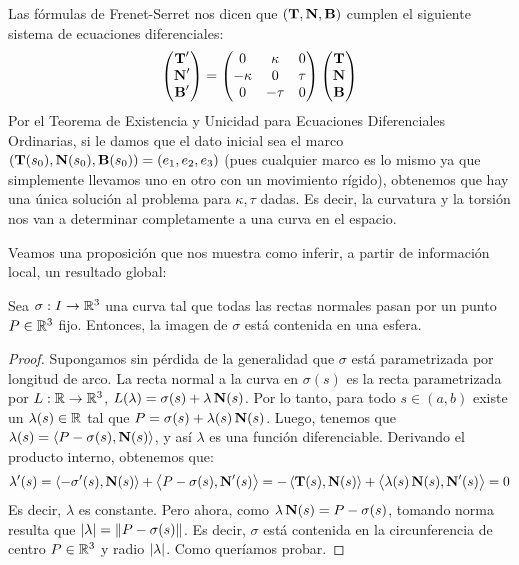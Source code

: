 Las fórmulas de Frenet-Serret nos dicen que $(\operatorname{\mathbf{T}},\operatorname{\mathbf{N}},\operatorname{\mathbf{B}})$ cumplen el siguiente sistema de ecuaciones diferenciales: $$\begin{pmatrix}\operatorname{\mathbf{T}}' \\ \operatorname{\mathbf{N}}'\\ \operatorname{\mathbf{B}}'\end{pmatrix} = \begin{pmatrix}0& \kappa & 0 \\ -\kappa & 0 & \tau \\ 0 & -\tau & 0\end{pmatrix}\begin{pmatrix}\operatorname{\mathbf{T}} \\ \operatorname{\mathbf{N}} \\ \operatorname{\mathbf{B}}\end{pmatrix}$$ Por el Teorema de Existencia y Unicidad para Ecuaciones Diferenciales Ordinarias, si le damos que el dato inicial sea el marco $(\operatorname{\mathbf{T}}(s_0),\operatorname{\mathbf{N}}(s_0),\operatorname{\mathbf{B}}(s_0)) = (e_1,e_2,e_3)$ (pues cualquier marco es lo mismo ya que simplemente llevamos uno en otro con un movimiento rígido), obtenemos que hay una única solución al problema para $\kappa,\tau$ dadas. Es decir, la curvatura y la torsión nos van a determinar completamente a una curva en el espacio.

Veamos una proposición que nos muestra como inferir, a partir de información local, un resultado global:

\begin{prop}
Sea $\sigma:I\to\mathbb{R}^3$ una curva tal que todas las rectas normales pasan por un punto $P\in\mathbb{R}^3$ fijo. Entonces, la imagen de $\sigma$ está contenida en una esfera.
\begin{proof}
Supongamos sin pérdida de la generalidad que $\sigma$ está parametrizada por longitud de arco. La recta normal a la curva en $\sigma(s)$ es la recta parametrizada por $L:\mathbb{R}\to\mathbb{R}^3$, $L(\lambda)=\sigma(s)+\lambda\operatorname{\mathbf{N}}(s)$. Por lo tanto, para todo $s\in(a,b)$ existe un $\lambda(s)\in\mathbb{R}$ tal que $P=\sigma(s)+\lambda(s)\operatorname{\mathbf{N}}(s)$. Luego, tenemos que $\lambda(s) = \left\langle P-\sigma(s),\operatorname{\mathbf{N}}(s) \right\rangle$, y así $\lambda$ es una función diferenciable. Derivando el producto interno, obtenemos que: $$\lambda'(s) = \left\langle -\sigma'(s),\operatorname{\mathbf{N}}(s) \right\rangle+\left\langle P-\sigma(s),\operatorname{\mathbf{N}}'(s) \right\rangle = -\left\langle \operatorname{\mathbf{T}}(s),\operatorname{\mathbf{N}}(s) \right\rangle+\left\langle \lambda(s)\operatorname{\mathbf{N}}(s),\operatorname{\mathbf{N}}'(s) \right\rangle = 0$$ Es decir, $\lambda$ es constante. Pero ahora, como $\lambda\operatorname{\mathbf{N}}(s)=P-\sigma(s)$, tomando norma resulta que $\left\lvert \lambda \right\rvert = \left\| P-\sigma(s) \right\|$. Es decir, $\sigma$ está contenida en la circunferencia de centro $P\in\mathbb{R}^3$ y radio $\left\lvert \lambda \right\rvert$. Como queríamos probar.
\end{proof}
\end{prop}
